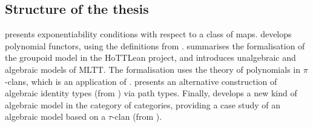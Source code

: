\subsection*{Structure of the thesis}
 presents exponentiability conditions with
respect to a class of maps.
 develops polynomial functors,
using the definitions from .
 summarises the formalisation of the groupoid model in the HoTTLean project,
and introduces unalgebraic and algebraic models of MLTT.
The formalisation uses the theory of polynomials in $\pi$-clans,
which is an application of .
 presents an alternative construction of
algebraic identity types (from ) via path types.
Finally,  develops a new kind of algebraic model
in the category of categories,
providing a case study of an algebraic model based on
a $\tau$-clan (from ).